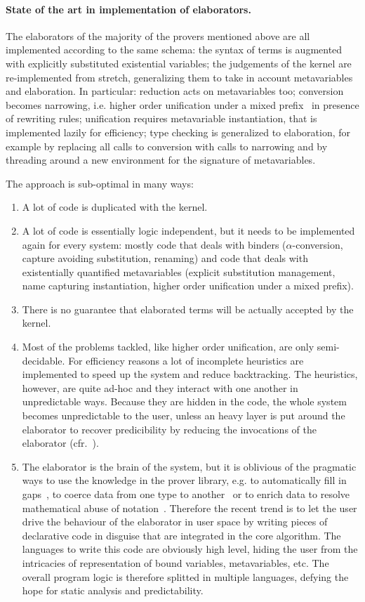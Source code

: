\documentclass{easychair}
\begin{document}
\paragraph{State of the art in implementation of elaborators.}

The elaborators of the majority of the provers mentioned above are all implemented according to the same schema: the syntax of terms is augmented with explicitly substituted existential variables; the judgements of the kernel are re-implemented from stretch, generalizing them to take in account metavariables and elaboration. In particular: reduction acts on metavariables too; conversion becomes narrowing, i.e. higher order unification under a mixed prefix~\cite{???} in presence of rewriting rules; unification requires metavariable instantiation, that is implemented lazily for efficiency; type checking is generalized to elaboration, for example by replacing all calls to conversion with calls to narrowing and by threading around a new environment for the signature of metavariables.

The approach is sub-optimal in many ways:
\begin{enumerate}
\item A lot of code is duplicated with the kernel.
\item A lot of code is essentially logic independent, but it needs to be
 implemented again for every system: mostly code that deals with binders ($\alpha$-conversion, capture avoiding substitution, renaming) and code that deals with existentially quantified metavariables (explicit substitution management, name capturing instantiation, higher order unification under a mixed prefix).
\item There is no guarantee that elaborated terms will be actually accepted by
 the kernel.
\item Most of the problems tackled, like higher order unification, are only semi-decidable. For efficiency reasons a lot of incomplete heuristics are implemented to speed up the system and reduce backtracking. The heuristics, however, are quite ad-hoc and they interact with one another in unpredictable ways. Because they are hidden in the code, the whole system becomes unpredictable to the user, unless an heavy layer is put around the elaborator to recover predicibility by reducing the invocations of the elaborator (cfr.~\cite{SOZEAU?}).
\item The elaborator is the brain of the system, but it is oblivious of the pragmatic ways to use the knowledge in the prover library, e.g. to automatically fill in gaps~\cite{mathcomponents}, to coerce data from one type to another~\cite{coercivesubtyping} or to enrich data to resolve mathematical abuse of notation~\cite{nonuniformunificationhints}. Therefore the recent trend is to let the user drive the behaviour of the elaborator in user space by writing pieces of declarative code in disguise that are integrated in the core algorithm. The languages to write this code are obviously high level, hiding the user from the intricacies of representation of bound variables, metavariables, etc. The overall program logic is therefore splitted in multiple languages, defying the hope for static analysis and predictability.
\end{enumerate}
\end{document}
